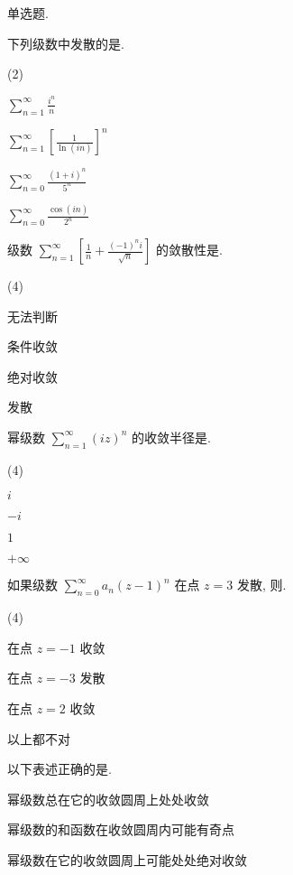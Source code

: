\sectionHomework
\begin{homework}
  \item 单选题.
  \begin{subex}
    \item 下列级数中发散的是\fillbrace{}.
    \begin{exchoice}(2)
			\item $\displaystyle\sum_{n=1}^\infty\frac{i^n}{n}$
			\item $\displaystyle\sum_{n=1}^\infty\left[\frac{1}{\ln (in)}\right]^n$
			\item $\displaystyle\sum_{n=0}^\infty\frac{(1+i)^n}{5^n}$
			\item $\displaystyle\sum_{n=0}^\infty\frac{\cos(in)}{2^n}$
		\end{exchoice}
		\item 级数 $\displaystyle\sum_{n=1}^\infty\left[\frac1n+\frac{(-1)^ni}{\sqrt n}\right]$ 的敛散性是\fillbrace{}.
    \begin{exchoice}(4)
			\item 无法判断
			\item 条件收敛
			\item 绝对收敛
			\item 发散
		\end{exchoice}
		\item 幂级数 $\displaystyle\sum_{n=1}^\infty (iz)^n$ 的收敛半径是\fillbrace{}.
    \begin{exchoice}(4)
			\item $i$
			\item $-i$
			\item $1$
			\item $+\infty$
		\end{exchoice}
		\item 如果级数 $\displaystyle\sum_{n=0}^\infty a_n(z-1)^n$ 在点 $z=3$ 发散, 则\fillbrace{}.
    \begin{exchoice}(4)
			\item 在点 $z=-1$ 收敛
			\item 在点 $z=-3$ 发散
			\item 在点 $z=2$ 收敛
			\item 以上都不对
		\end{exchoice}
		\item 以下表述正确的是\fillbrace{}.
    \begin{exchoice}
			\item 幂级数总在它的收敛圆周上处处收敛
			\item 幂级数的和函数在收敛圆周内可能有奇点
			\item 幂级数在它的收敛圆周上可能处处绝对收敛

\end{exchoice}
\end{subex}
\end{homework}

